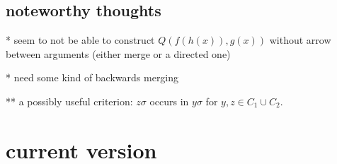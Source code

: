 \documentclass[,%
	paper=a4,%
	DIV11, %
	twoside=false,%
	liststotoc,
	bibtotoc,
	draft=false,%
	numbers=noendperiod
]{scrartcl}
\begin{document}
\newcommand{\substremarksym}{$\ast$}
\newcommand{\substremarkref}{$(\ast)$}

\newcommand{\lif}[1]{\lift{\Delta}{#1}{x}}
\newcommand{\newterm}{^*}
\newcommand{\de}{^\Delta}


\subsection*{noteworthy thoughts}

* seem to not be able to construct $Q(f(h(x)), g(x))$ without arrow between arguments (either merge or a directed one) 

* need some kind of backwards merging

** a possibly useful criterion: $z\sigma$ occurs in $y\sigma$ for $y, z \in C_1 \cup C_2$.





\section{current version}





\end{document}

